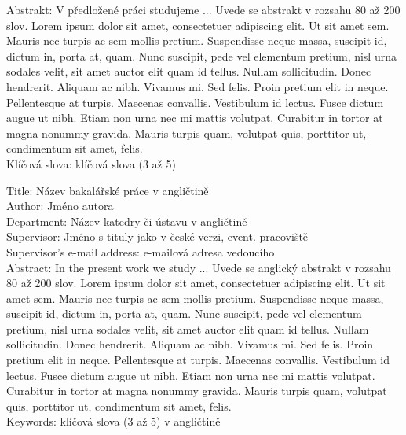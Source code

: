 \documentclass[12pt,notitlepage]{report}
\begin{document}
\noindent Abstrakt:  V předložené práci studujeme ... Uvede se abstrakt v rozsahu 80 až 200 slov. Lorem ipsum dolor sit amet, consectetuer adipiscing elit. Ut sit amet sem. Mauris nec turpis ac sem mollis pretium. Suspendisse neque massa, suscipit id, dictum in, porta at, quam. Nunc suscipit, pede vel elementum pretium, nisl urna sodales velit, sit amet auctor elit quam id tellus. Nullam sollicitudin. Donec hendrerit. Aliquam ac nibh. Vivamus mi. Sed felis. Proin pretium elit in neque. Pellentesque at turpis. Maecenas convallis. Vestibulum id lectus. Fusce dictum augue ut nibh. Etiam non urna nec mi mattis volutpat. Curabitur in tortor at magna nonummy gravida. Mauris turpis quam, volutpat quis, porttitor ut, condimentum sit amet, felis.\\

\noindent Klíčová slova: klíčová slova (3 až 5)

\vspace{10mm}

\noindent
Title: Název bakalářské práce v angličtině\\
Author: Jméno autora\\
Department: Název katedry či ústavu v angličtině\\
Supervisor: Jméno s tituly jako v české verzi, event. pracoviště\\
Supervisor's e-mail address: e-mailová adresa vedoucího\\

\noindent Abstract: In the present work we study ... Uvede se anglický abstrakt v rozsahu 80 až 200 slov. Lorem ipsum dolor sit amet, consectetuer adipiscing elit. Ut sit amet sem. Mauris nec turpis ac sem mollis pretium. Suspendisse neque massa, suscipit id, dictum in, porta at, quam. Nunc suscipit, pede vel elementum pretium, nisl urna sodales velit, sit amet auctor elit quam id tellus. Nullam sollicitudin. Donec hendrerit. Aliquam ac nibh. Vivamus mi. Sed felis. Proin pretium elit in neque. Pellentesque at turpis. Maecenas convallis. Vestibulum id lectus. Fusce dictum augue ut nibh. Etiam non urna nec mi mattis volutpat. Curabitur in tortor at magna nonummy gravida. Mauris turpis quam, volutpat quis, porttitor ut, condimentum sit amet, felis. \\

\noindent Keywords: klíčová slova (3 až 5) v angličtině

\newpage

\end{document}
